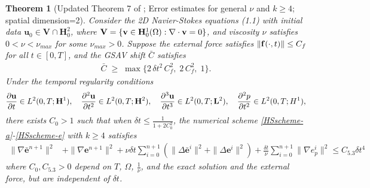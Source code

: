 \documentclass{article}
\newtheorem{theorem}{Theorem}[section]      %
\theoremstyle{definition}                   %
\begin{document}
\begin{theorem}[Updated Theorem 7 of \cite{HuangShen2023}; Error estimates for general $\nu$ and $k \geq 4$; spatial dimension=2]
\label{Theorem 7-new}
Consider the 2D Navier-Stokes equations (1.1) with initial data $\mathbf{u}_0 \in \mathbf{V} \cap \mathbf{H}^2_0$, where ${\bf V}=\{{\bf v}\in {\bf H}^1_0(\Omega): \nabla\cdot {\bf v}=0 \}$, 
and viscosity $\nu$ satisfies $0<\nu<\nu_{max}$ for some $\nu_{max}>0$.
Suppose the external force satisfies $\|{\bf f}(\cdot,t)\| \le C_f$ for all $t\in[0,T]$,
and the GSAV shift $\bar C$ satisfies
\begin{align}
\bar C \;\ge\; \max\bigl\{ 2\,\delta t^{2}\, C_f^{2},\; 2\,C_f^{2},\; 1\bigr\}.
\label{eq:Cbar_condition_Thm44}
\end{align}
Under the temporal regularity conditions
\begin{align*}
\frac{\partial\mathbf{u}}{\partial t} \in L^2(0,T;{\bf H}^1), 
\quad
\frac{\partial^2\mathbf{u}}{\partial t^2} \in L^2(0,T;{\bf H}^2),
\quad
\frac{\partial^3\mathbf{u}}{\partial t^3} \in L^2(0,T;{\bf L}^2), \quad
\frac{\partial^2 p}{\partial t^2} \in L^2(0,T;H^1), 
\end{align*}
there exists $C_0>1$ such that  when $\delta t \leq \frac{1}{1+2C_0^2}$, the numerical scheme \eqref{HSscheme-a}-\eqref{HSscheme-e} with $k \geq 4$ satisfies
\begin{align}
\|\nabla\bar{\mathbf{e}}^{n+1}\|^2 &+ \|\nabla \mathbf{e}^{n+1}\|^2 + \nu \delta t \sum_{i=0}^{n+1} \left( \|\Delta\bar{\mathbf{e}}^i\|^2 + \|\Delta \mathbf{e}^i\|^2 \right) + \frac{\delta t}{\nu} \sum_{i=0}^{n+1} \|\nabla e^i_p\|^2  \leq C_{5.3}\delta t^4
\label{5.3-new}
\end{align}
where $C_0, C_{5.3}> 0$ depend on $T$, $\Omega$, $\frac{1}{\nu}$, and the exact solution and the external force, but are independent of $\delta t$.
\end{theorem}
\end{document}
